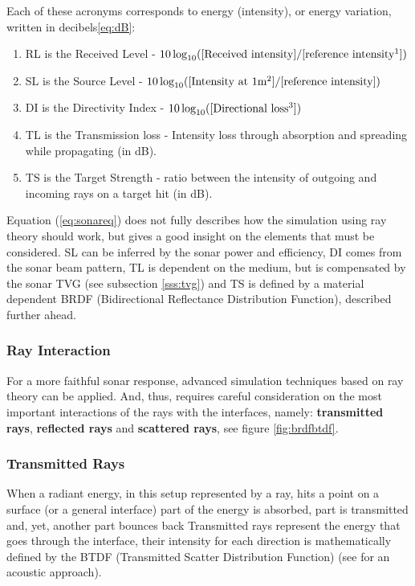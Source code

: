 Each of these acronyms corresponds to energy (intensity), or energy variation,
written in decibels\ref{eq:dB}:
\begin{enumerate}
  \item RL is the Received Level - $10\log_{10}([\text{Received
  intensity}]/[\text{reference intensity\footnotemark}])$
  \item SL is the Source Level - $10\log_{10}([\text{Intensity at
  1m\footnotemark}]/[\text{reference
  intensity}])$
  \item DI is the Directivity Index - $10\log_{10}([\text{Directional
  loss\footnotemark}])$
  \item TL is the Transmission loss - Intensity loss through absorption and
  spreading while propagating (in dB).
  \item TS is the Target Strength - ratio between the intensity of outgoing
  and incoming rays on a target hit (in dB).
\end{enumerate}



Equation (\ref{eq:sonareq}) does not fully describes how the simulation
using ray theory should work, but gives a good insight on the elements that must
be considered. SL can be inferred by the sonar power and efficiency, DI comes
from the sonar beam pattern, TL is dependent on the medium, but is compensated
by the sonar TVG (see subsection \ref{sss:tvg}) and TS is defined by a material
dependent BRDF (Bidirectional Reflectance Distribution Function), described further ahead.

\subsubsection{Ray Interaction}

For a more faithful sonar response, advanced simulation techniques based on ray
theory can be applied. And, thus, requires careful consideration on the most
important interactions of the rays with the interfaces, namely:
\textbf{transmitted rays}, \textbf{reflected rays}  and \textbf{scattered rays},
see figure \ref{fig:brdfbtdf}.

\subsubsection{Transmitted Rays}
When a radiant energy, in this setup represented by a ray, hits a point on a
surface (or a general interface) part of the energy is absorbed, part is
transmitted and, yet, another part bounces back Transmitted rays represent the
energy that goes through the interface, their intensity for each direction is
mathematically defined by the BTDF (Transmitted Scatter Distribution
Function)\cite{bartell1981theory} (see \citet{rober2007ray} for an acoustic
approach).



